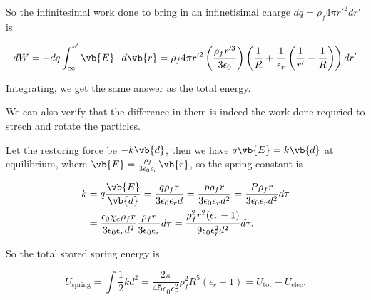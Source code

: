 \documentclass[english,a4paper,12pt]{report}
\begin{document}
{So the infinitesimal work done to bring in an infinetisimal charge \(dq = \rho _{f} 4\pi r'^2dr'\) is 

\begin{equation}
    dW = - dq\int_{\infty}^{r'}\vb{E} \cdot d\vb{r} = \rho _{f}4\pi r'^2 \left(\frac{\rho _{f}r'^3  }{3 \epsilon_0 }\right)\left( \frac{1}{R} + \frac{1}{\epsilon _{r} }\left( \frac{1}{r'}-\frac{1}{R}   \right)   \right)dr'    
\end{equation}

Integrating, we get the same answer as the total energy.


We can also verify that the difference in them is indeed the work done requried to strech and rotate the particles. 

Let the restoring force be \(-k\vb{d} \), then we have \(q\vb{E} = k\vb{d} \) at equilibrium, where \(\vb{E} = \frac{\rho _{f} }{3\epsilon_0 \epsilon _{r} }\vb{r}  \), so the spring constant is 

\begin{equation}
    \begin{aligned} 
    k &= q\frac{\vb{E} }{\vb{d} } = \frac{q\rho _{f} r}{3\epsilon_0 \epsilon _{r} d} = \frac{p\rho _{f} r}{3\epsilon_0 \epsilon _{r} d^2} = \frac{P\rho _{f} r}{3\epsilon_0 \epsilon _{r} d^2} d\tau \\
    &= \frac{\epsilon_0 \chi _{e} \rho _{f} r}{3\epsilon_0 \epsilon _{r} d^2} \frac{\rho _{f}r }{3\epsilon_0 \epsilon _{r} } d\tau = \frac{\rho _{f}^2r^2(\epsilon _{r}-1 ) }{9\epsilon_0 \epsilon _{r}^2d^2 }d\tau . 
    \end{aligned} 
\end{equation}

So the total stored spring energy is 

\begin{equation}
    U_{\text{spring} } = \int \frac{1}{2}kd^2 = \frac{2\pi }{45\epsilon_0 \epsilon _{r}^2 }\rho _{f}^2R^{5}(\epsilon _{r}-1 ) = U_{\text{tot} }- U_{\text{elec} }.    
\end{equation}}
\end{document}

